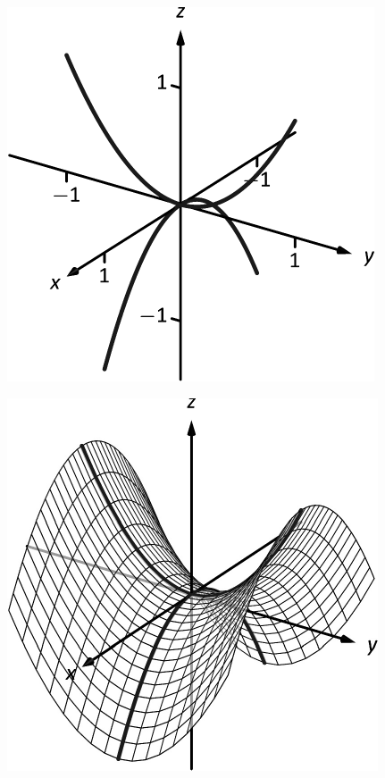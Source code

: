 \documentclass[10pt]{article}
\begin{document}
\includegraphics{figspace5c_3DBW.pdf}
\texttt{}

\includegraphics{figspace5cb_3DBW.pdf}
\texttt{}
\end{document}
